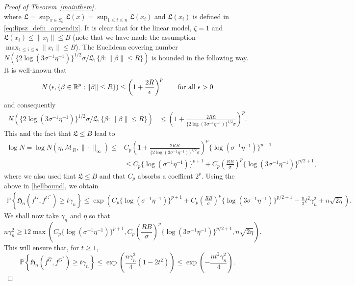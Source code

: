 \documentclass[11pt]{article}
\numberwithin{equation}{section}
\def\qt#1{\qquad\text{#1}}
\newcommand{\lipsz}{\mathfrak{L}}
\newcommand{\PP}{\mathbb{P}}
\begin{document}
\begin{appendices}
\begin{proof}[Proof of Theorem~\ref{mainthem}]
\[\]
where $\lipsz = \sup_{x \in S_0} \lipsz(x) = \sup_{1\leq i \leq n} \lipsz(x_i)$ and $\lipsz(x_i)$ is defined in \eqref{eq:lipsz_defn_appendix}. It is clear that for the linear model,  $\zeta = 1$ and $\lipsz(x_i) \leq \| x_i\| \leq B$ (note that we have made the assumption $\max_{1 \leq i \leq n} \|x_i\| \leq B$). The Euclidean covering number $N(\{2 \log(3\sigma^{-1}\eta^{-1})\}^{1/2} \sigma/\lipsz,\{\beta : \|\beta\| \leq R \})$ is bounded in the following way. It is well-known that 
\[
N\left(\epsilon, \{\beta \in \mathbb{R}^p : \|\beta\| \leq R\} \right) \leq \left( 1+ \frac{2R}{\epsilon}  \right)^p \qt{for all $ \epsilon > 0$}
\]
and consequently
\[
\begin{split}
N(\{2 \log(3\sigma^{-1}\eta^{-1})\}^{1/2} \sigma/\lipsz, \{\beta : \|\beta\| \leq R\}) & \leq 
\left(  1+ \frac{2R\lipsz}{\{2 \log(3\sigma^{-1}\eta^{-1})\}^{1/2} \sigma}\right)^p. 
\end{split}
\]
This and the fact that $\lipsz \leq B$ lead to   
\[
\begin{split}
\log N =  \log N(\eta, \mathcal{M}_R, \| \cdot \|_{\infty}) \leq &C_p  \left(1+ \frac{2 R B}{\{2 \log(3\sigma^{-1}\eta^{-1})\}^{1/2} \sigma}\right)^p \{\log(\sigma^{-1}\eta^{-1})\}^{p+1} \\
  &\leq C_p \{\log(\sigma^{-1}\eta^{-1})\}^{p+1} + C_p \left(\frac{RB}{\sigma} \right)^p \{\log (3 \sigma^{-1} \eta^{-1}) \}^{p/2+1},
\end{split}
\]
where we also used that $\lipsz \leq B$ and that $C_p$ absorbs a coeffient $2^p$. Using the above in \eqref{hellbound}, we obtain
\begin{equation*}
  \begin{split}
    \PP \left\{\mathfrak{H}_n(f^{\hat{G}}, f^{G^*}) \geq t \gamma_n \right\}  \leq \exp \left(  C_p \{\log(\sigma^{-1}\eta^{-1})\}^{p+1} + C_p \left(\frac{RB}{\sigma} \right)^p \{\log (3 \sigma^{-1} \eta^{-1}) \}^{p/2+1} - \frac{n}{2} t^2\gamma_n^2 + n \sqrt{2 \eta}\right). 
    \end{split}
  \end{equation*}
We shall now take $\gamma_n$  and $\eta$ so that
\begin{equation}\label{gamma.crit}
  n \gamma_n^2 \geq 12 \max \left(C_p \{\log(\sigma^{-1}\eta^{-1})\}^{p+1}, C_p \left(\frac{RB}{\sigma} \right)^p \{\log (3 \sigma^{-1} \eta^{-1})  \}^{p/2+1}, n \sqrt{2 \eta} \right). 
\end{equation}
This will ensure that, for $t \geq 1$,
\begin{equation}\label{hell.tail}
  \PP \left\{\mathfrak{H}_n(f^{\hat{G}}, f^{G^*}) \geq t \gamma_n \right\}  \leq \exp \left(\frac{n \gamma_n^2}{4} (1 - 2 t^2) \right)  \leq \exp \left(-\frac{n t^2 \gamma_n^2}{4} \right). 

\end{equation}
\end{proof}
\end{appendices}
\end{document}
